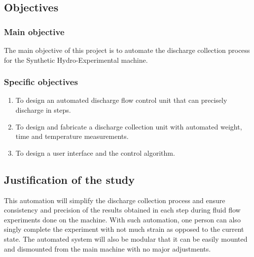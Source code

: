 \subsection{Objectives}
\subsubsection{Main objective}

The main objective of this project is to automate the discharge collection process for the Synthetic Hydro-Experimental machine. 

\subsubsection{Specific objectives}

\begin{enumerate}
	\item To design an automated discharge flow control unit that can precisely discharge in steps.
	\item To design and fabricate a discharge collection unit with automated weight, time and temperature measurements.
    \item To design a user interface and the control algorithm.

\end{enumerate}


\subsection{Justification of the study}

This automation will simplify the discharge collection process and ensure consistency and precision of the results obtained in each step during fluid flow experiments done on the machine. With such automation, one person can also singly complete the experiment with not much strain as opposed to the current state. The automated system will also be modular that it can be easily mounted and dismounted from the main machine with no major adjustments.